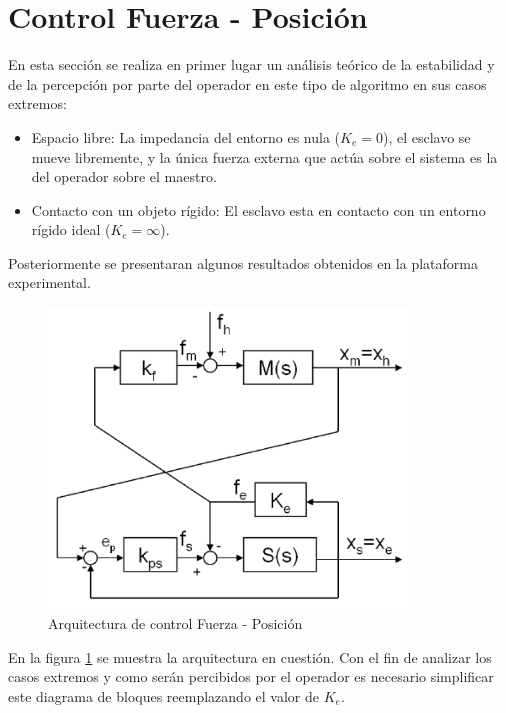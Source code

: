 \section{Control Fuerza - Posición}
\label{sec:force-position}
En esta sección se realiza en primer lugar un análisis teórico de la estabilidad y de la percepción por parte del operador en este tipo de algoritmo en sus casos extremos:
\begin{itemize}
\item Espacio libre: La impedancia del entorno es nula ($K_e = 0$), el esclavo se mueve libremente, y la única fuerza externa que actúa sobre el sistema es la del operador sobre el maestro.
\item Contacto con un objeto rígido: El esclavo esta en contacto con un entorno rígido ideal ($K_e = \infty$).
\end{itemize}
Posteriormente se presentaran algunos resultados obtenidos en la plataforma experimental.
\begin{figure}[htbp]
\centering
	\includegraphics[height=8cm]{force-pos}
	\caption{Arquitectura de control Fuerza - Posición}
  	\label{fig:force-pos} 
\end{figure}
En la figura \ref{fig:force-pos} se muestra la arquitectura en cuestión. Con el fin de analizar los casos extremos y como serán percibidos por el operador es necesario simplificar este diagrama de bloques reemplazando el valor de $K_e$.
